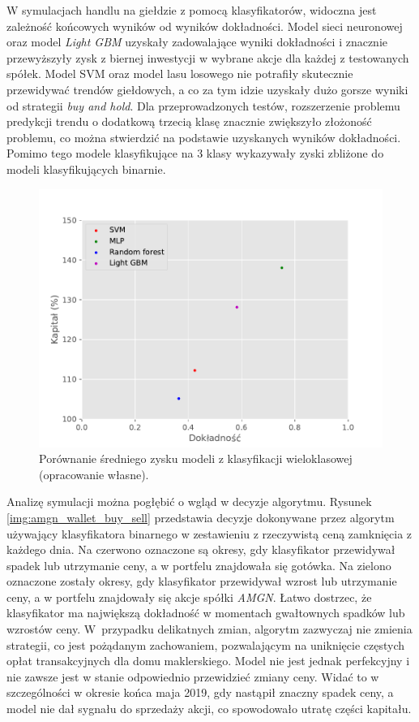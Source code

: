 \documentclass[a4paper, twoside, 11pt, openright]{article}
\begin{document}
W symulacjach handlu na giełdzie z pomocą klasyfikatorów, widoczna jest zależność końcowych wyników od wyników dokładności. Model sieci neuronowej oraz model \textit{Light GBM} uzyskały zadowalające wyniki dokładności i znacznie przewyższyły zysk z biernej inwestycji w wybrane akcje dla każdej z testowanych spółek. Model SVM oraz model lasu losowego nie potrafiły skutecznie przewidywać trendów giełdowych, a co za tym idzie uzyskały dużo gorsze wyniki od strategii \textit{buy and hold}. Dla przeprowadzonych testów, rozszerzenie problemu predykcji trendu o dodatkową trzecią klasę znacznie zwiększyło złożoność problemu, co można stwierdzić na podstawie uzyskanych wyników dokładności. Pomimo tego modele klasyfikujące na 3 klasy wykazywały zyski zbliżone do modeli klasyfikujących binarnie.

\begin{figure}[H]
\centering \includegraphics[scale=0.9]{img/summary-discrete-gain-summary.pdf}
\caption{Porównanie średniego zysku modeli z klasyfikacji wieloklasowej (opracowanie własne).}
\label{img:summary-discrete-gain}
\end{figure}

\bigskip


Analizę symulacji można pogłębić o wgląd w decyzje algorytmu. Rysunek \ref{img:amgn_wallet_buy_sell} przedstawia decyzje dokonywane przez algorytm używający klasyfikatora binarnego w zestawieniu z rzeczywistą ceną zamknięcia z każdego dnia. Na czerwono oznaczone są okresy, gdy klasyfikator przewidywał spadek lub utrzymanie ceny, a w portfelu znajdowała się gotówka. Na zielono oznaczone zostały okresy, gdy klasyfikator przewidywał wzrost lub utrzymanie ceny, a w portfelu znajdowały się akcje spółki \textit{AMGN}. Łatwo dostrzec, że klasyfikator ma największą dokładność w momentach gwałtownych spadków lub wzrostów ceny. W~przypadku delikatnych zmian, algorytm zazwyczaj nie zmienia strategii, co jest pożądanym zachowaniem, pozwalającym na uniknięcie częstych opłat transakcyjnych dla domu maklerskiego. Model nie jest jednak perfekcyjny i nie zawsze jest w stanie odpowiednio przewidzieć zmiany ceny. Widać to w szczególności w okresie końca maja 2019, gdy nastąpił znaczny spadek ceny, a model nie dał sygnału do sprzedaży akcji, co spowodowało utratę części kapitału.
\end{document}
